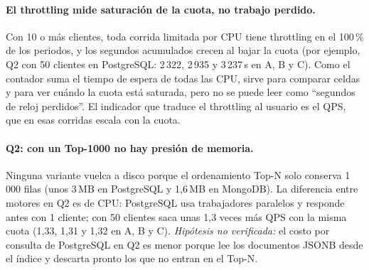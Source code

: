 \documentclass[11pt,a4paper]{article}
\begin{document}
\paragraph{El throttling mide saturación de la cuota, no trabajo perdido.} Con 10 o más
clientes, toda corrida limitada por CPU tiene throttling en el 100\,\% de los periodos, y
los segundos acumulados crecen al bajar la cuota (por ejemplo, Q2 con 50 clientes en
PostgreSQL: 2\,322, 2\,935 y 3\,237\,s en A, B y C). Como el contador suma el tiempo de
espera de todas las CPU, sirve para comparar celdas y para ver cuándo la cuota está
saturada, pero no se puede leer como ``segundos de reloj perdidos''. El indicador que
traduce el throttling al usuario es el QPS, que en esas corridas escala con la cuota.

\paragraph{Q2: con un Top-1000 no hay presión de memoria.} Ninguna variante vuelca a disco
porque el ordenamiento Top-N solo conserva 1\,000 filas (unos 3\,MB en PostgreSQL y
1,6\,MB en MongoDB). La diferencia entre motores en Q2 es de CPU: PostgreSQL usa
trabajadores paralelos y responde antes con 1 cliente; con 50 clientes saca unas 1,3 veces más
QPS con la misma cuota (1,33, 1,31 y 1,32 en A, B y C). \emph{Hipótesis no verificada:} el costo por
consulta de PostgreSQL en Q2 es menor porque lee los documentos JSONB desde el índice y
descarta pronto los que no entran en el Top-N.

\end{document}
